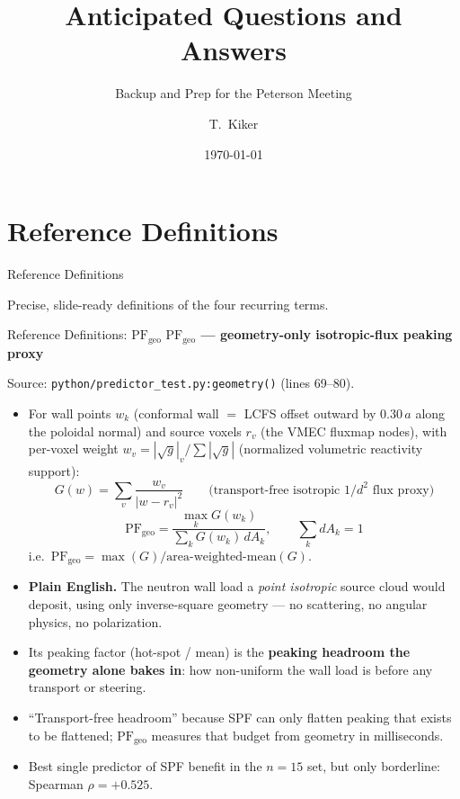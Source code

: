 \documentclass[11pt,aspectratio=169]{beamer}
\title{Anticipated Questions and Answers}
\subtitle{Backup and Prep for the Peterson Meeting}
\author{T.\ Kiker}
\date{\today}
\newcommand{\qitem}[1]{\medskip\textbf{#1}\par}
\begin{document}
\frame{\titlepage}

\section{Reference Definitions}
\begin{frame}
\centering
\vfill
{\Large\color{key} Reference Definitions}\par
\medskip
{\footnotesize Precise, slide-ready definitions of the four recurring terms.}
\vfill
\end{frame}

\begin{frame}[allowframebreaks]{Reference Definitions: $\mathrm{PF_{geo}}$}
\small
\qitem{$\mathrm{PF_{geo}}$ --- geometry-only isotropic-flux peaking proxy}
Source: \texttt{python/predictor\_test.py:geometry()} (lines 69--80).
\begin{itemize}
\item For wall points $w_k$ (conformal wall $=$ LCFS offset outward by $0.30\,a$ along the
      poloidal normal) and source voxels $r_v$ (the VMEC fluxmap nodes), with per-voxel
      weight $w_v = |\sqrt{g}|_v / \sum |\sqrt{g}|$ (normalized volumetric reactivity
      support):
\[
G(w) = \sum_v \frac{w_v}{|w - r_v|^2}
\qquad\text{(transport-free isotropic $1/d^2$ flux proxy)}
\]
\[
\mathrm{PF_{geo}} = \frac{\max_k G(w_k)}{\sum_k G(w_k)\, dA_k},
\qquad \sum_k dA_k = 1
\]
i.e.\ $\mathrm{PF_{geo}} = \max(G) / \text{area-weighted-mean}(G)$.
\item \textbf{Plain English.} The neutron wall load a \emph{point isotropic} source cloud
      would deposit, using only inverse-square geometry --- no scattering, no angular
      physics, no polarization.
\item Its peaking factor (hot-spot / mean) is the \textbf{peaking headroom the geometry
      alone bakes in}: how non-uniform the wall load is before any transport or steering.
\item ``Transport-free headroom'' because SPF can only flatten peaking that exists to be
      flattened; $\mathrm{PF_{geo}}$ measures that budget from geometry in milliseconds.
\item Best single predictor of SPF benefit in the $n=15$ set, but only borderline: Spearman
      $\rho = +0.525$.
\end{itemize}
\end{frame}
\end{document}
